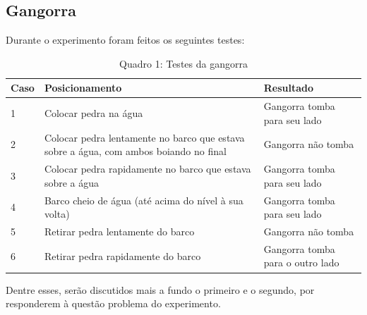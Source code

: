 \subsection{Gangorra}

Durante o experimento foram feitos os seguintes testes:
\begin{table}[H]
    \centering
    \captionsetup{name=Quadro}
    \caption*{Quadro 1: Testes da gangorra}
    \begin{tabular}{|m{2em}|m{15em}|m{13em}|}
    \hline
        \textbf{Caso} & \textbf{Posicionamento} & \textbf{Resultado} \\ \hline
        1 & Colocar pedra na água & Gangorra tomba para seu lado \\ \hline
        2 & Colocar pedra lentamente no barco que estava sobre a água, com ambos boiando no final & Gangorra não tomba \\ \hline
        3 & Colocar pedra rapidamente no barco que estava sobre a água & Gangorra tomba para seu lado \\ \hline
        4 & Barco cheio de água (até acima do nível à sua volta) & Gangorra tomba para seu lado \\ \hline
        5 & Retirar pedra lentamente do barco & Gangorra não tomba \\ \hline
        6 & Retirar pedra rapidamente do barco & Gangorra tomba para o outro lado \\ \hline
    \end{tabular}
    \label{TabGangorra}
\end{table}
Dentre esses, serão discutidos mais a fundo o primeiro e o segundo, por responderem à questão problema do experimento.

